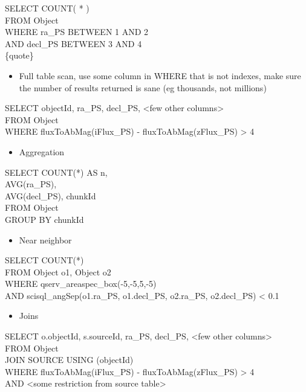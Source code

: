 SELECT COUNT( * )\\
FROM Object\\
WHERE ra\_PS BETWEEN 1 AND 2\\
AND decl\_PS BETWEEN 3 AND 4\\
\{quote\}

\begin{itemize}
\item
  Full table scan, use some column in WHERE that is not indexes, make
  sure the number of results returned is sane (eg thousands, not
  millions)
\end{itemize}

SELECT objectId, ra\_PS, decl\_PS, \textless{}few other
columns\textgreater{}\\
FROM Object\\
WHERE fluxToAbMag(iFlux\_PS) - fluxToAbMag(zFlux\_PS) \textgreater{} 4

\begin{itemize}
\item
  Aggregation
\end{itemize}

SELECT COUNT(*) AS n,\\
AVG(ra\_PS),\\
AVG(decl\_PS), chunkId\\
FROM Object\\
GROUP BY chunkId

\begin{itemize}
\item
  Near neighbor
\end{itemize}

SELECT COUNT(*)\\
FROM Object o1, Object o2\\
WHERE qserv\_areaspec\_box(-5,-5,5,-5)\\
AND scisql\_angSep(o1.ra\_PS, o1.decl\_PS, o2.ra\_PS, o2.decl\_PS)
\textless{} 0.1

\begin{itemize}
\item
  Joins
\end{itemize}

SELECT o.objectId, s.sourceId, ra\_PS, decl\_PS, \textless{}few other
columns\textgreater{}\\
FROM Object\\
JOIN SOURCE USING (objectId)\\
WHERE fluxToAbMag(iFlux\_PS) - fluxToAbMag(zFlux\_PS) \textgreater{} 4\\
AND \textless{}some restriction from source table\textgreater{}~
